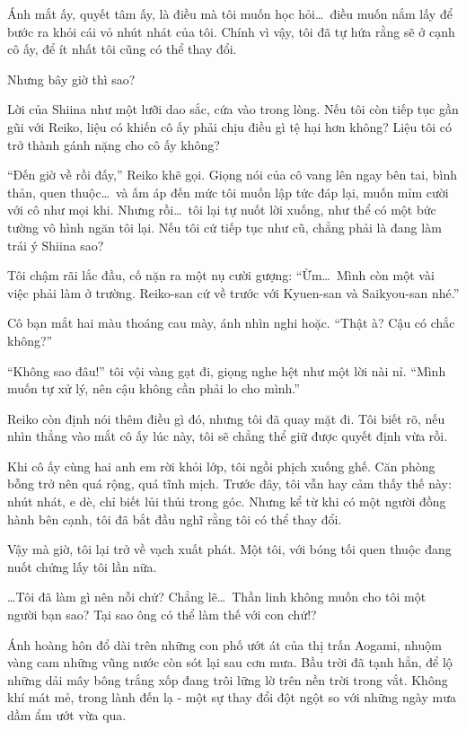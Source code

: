 \documentclass[../main.tex]{subfiles}
\begin{document}
Ánh mắt ấy, quyết tâm ấy, là điều mà tôi muốn học hỏi\dots\ điều muốn nắm lấy để bước ra khỏi cái vỏ nhút nhát của tôi. Chính vì vậy, tôi đã tự hứa rằng sẽ ở cạnh cô ấy, để ít nhất tôi cũng có thể thay đổi.

Nhưng bây giờ thì sao?

Lời của Shiina như một lưỡi dao sắc, cứa vào trong lòng. Nếu tôi còn tiếp tục gần gũi với Reiko, liệu có khiến cô ấy phải chịu điều gì tệ hại hơn không? Liệu tôi có trở thành gánh nặng cho cô ấy không?

``Đến giờ về rồi đấy,'' Reiko khẽ gọi. Giọng nói của cô vang lên ngay bên tai, bình thản, quen thuộc\dots\ và ấm áp đến mức tôi muốn lập tức đáp lại, muốn mỉm cười với cô như mọi khi. Nhưng rồi\dots\ tôi lại tự nuốt lời xuống, như thể có một bức tường vô hình ngăn tôi lại. Nếu tôi cứ tiếp tục như cũ, chẳng phải là đang làm trái ý Shiina sao?

Tôi chậm rãi lắc đầu, cố nặn ra một nụ cười gượng: ``Ừm\dots\ Mình còn một vài việc phải làm ở trường. Reiko-san cứ về trước với Kyuen-san và Saikyou-san nhé.''

Cô bạn mắt hai màu thoáng cau mày, ánh nhìn nghi hoặc. ``Thật à? Cậu có chắc không?''

``Không sao đâu!'' tôi vội vàng gạt đi, giọng nghe hệt như một lời nài nỉ. ``Mình muốn tự xử lý, nên cậu không cần phải lo cho mình.''

Reiko còn định nói thêm điều gì đó, nhưng tôi đã quay mặt đi. Tôi biết rõ, nếu nhìn thẳng vào mắt cô ấy lúc này, tôi sẽ chẳng thể giữ được quyết định vừa rồi.

Khi cô ấy cùng hai anh em rời khỏi lớp, tôi ngồi phịch xuống ghế. Căn phòng bỗng trở nên quá rộng, quá tĩnh mịch. Trước đây, tôi vẫn hay cảm thấy thế này: nhút nhát, e dè, chỉ biết lủi thủi trong góc. Nhưng kể từ khi có một người đồng hành bên cạnh, tôi đã bắt đầu nghĩ rằng tôi có thể thay đổi.

Vậy mà giờ, tôi lại trở về vạch xuất phát. Một tôi, với bóng tối quen thuộc đang nuốt chửng lấy tôi lần nữa.

\dots Tôi đã làm gì nên nỗi chứ? Chẳng lẽ\dots\ Thần linh không muốn cho tôi một người bạn sao? Tại sao ông có thể làm thế với con chứ!?


Ánh hoàng hôn đổ dài trên những con phố ướt át của thị trấn Aogami, nhuộm vàng cam những vũng nước còn sót lại sau cơn mưa. Bầu trời đã tạnh hẳn, để lộ những dải mây bông trắng xốp đang trôi lững lờ trên nền trời trong vắt. Không khí mát mẻ, trong lành đến lạ - một sự thay đổi đột ngột so với những ngày mưa dầm ẩm ướt vừa qua.
\end{document}
